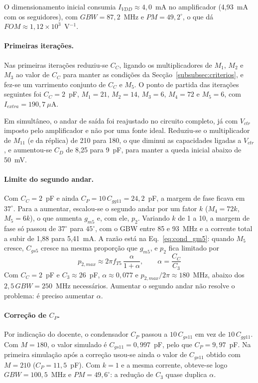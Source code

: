 O dimensionamento inicial consumia $I_{VDD} \approx 4{,}0$~mA no amplificador (4,93~mA com os seguidores), com
$GBW = 87{,}2$~MHz e $PM = 49{,}2^\circ$, o que dá $FOM \approx 1{,}12\times10^3$~V$^{-1}$.

\paragraph{Primeiras iterações.}
Nas primeiras iterações reduziu-se $C_C$, ligando os multiplicadores de $M_{1}$, $M_{2}$ e $M_{3}$ ao valor de $C_C$
para manter as condições da Secção~\ref{subsubsec:criterios}, e fez-se um varrimento conjunto de $C_C$ e $M_5$. O
ponto de partida das iterações seguintes foi $C_C = 2$~pF, $M_1 = 21$, $M_2 = 14$, $M_3 = 6$, $M_4 = 72$ e $M_5 = 6$,
com $I_{extra} = 190{,}7~\mu$A.

Em simultâneo, o andar de saída foi reajustado no circuito completo, já com $V_{ctr}$ imposto pelo amplificador e não
por uma fonte ideal. Reduziu-se o multiplicador de $M_{11}$ (e da réplica) de 210 para 180, o que diminui as
capacidades ligadas a $V_{ctr}$, e aumentou-se $C_D$ de 8,25 para 9~pF, para manter a queda inicial abaixo de 50~mV.

\paragraph{Limite do segundo andar.}
Com $C_C = 2$~pF e ainda $C_P = 10\,C_{gg11} = 24{,}2$~pF, a margem de fase ficava em $37^\circ$. Para a aumentar,
escalou-se o segundo andar por um fator $k$ ($M_4 = 72k$, $M_5 = 6k$), o que aumenta $g_{m5}$ e, com ele, $p_2$.
Variando $k$ de 1 a 10, a margem de fase só passou de $37^\circ$ para $45^\circ$, com o GBW entre 85 e 93~MHz e a
corrente total a subir de 1,88 para 5,41~mA. A razão está na Eq.~\eqref{eq:cond_gm5}: quando $M_5$ cresce, $C_{gs5}$
cresce na mesma proporção que $g_{m5}$, e $p_2$ fica limitado por
\begin{equation}
    p_{2,max} \approx 2\pi f_{T5}\,\frac{\alpha}{1+\alpha}, \qquad \alpha = \frac{C_C}{C_3}
\end{equation}
Com $C_C = 2$~pF e $C_3 \approx 26$~pF, $\alpha \approx 0{,}077$ e $p_{2,max}/2\pi \approx 180$~MHz, abaixo dos
$2{,}5\,GBW = 250$~MHz necessários. Aumentar o segundo andar não resolve o problema: é preciso aumentar $\alpha$.

\paragraph{Correção de $C_P$.}
Por indicação do docente, o condensador $C_P$ passou a $10\,C_{gs11}$ em vez de $10\,C_{gg11}$. Com $M = 180$, o valor
simulado é $C_{gs11} = 0{,}997$~pF, pelo que $C_P = 9{,}97$~pF. Na primeira simulação após a correção usou-se ainda o
valor de $C_{gs11}$ obtido com $M = 210$ ($C_P = 11{,}5$~pF). Com $k = 1$ e a mesma corrente, obteve-se logo
$GBW = 100{,}5$~MHz e $PM = 49{,}6^\circ$: a redução de $C_3$ quase duplica $\alpha$.


